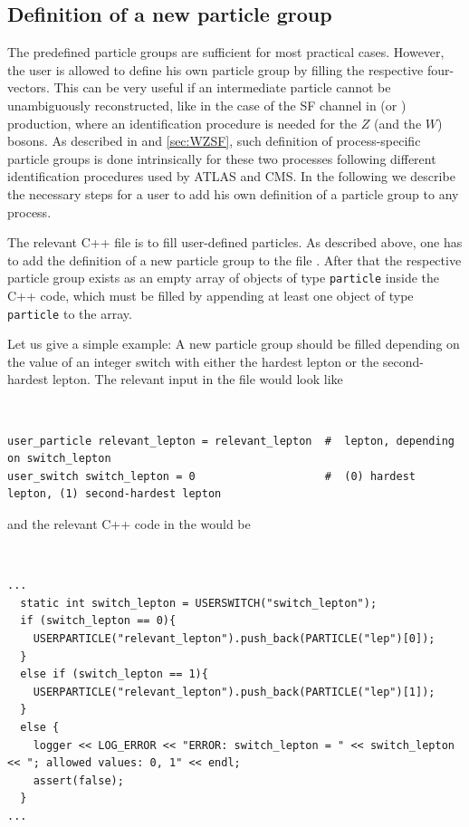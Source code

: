 \documentclass[english,11pt]{article}
\begin{document}
\subsection{Definition of a new particle group}\label{app:particlegroup}

The predefined particle groups are sufficient for most practical cases. However, the user
is allowed to define his own particle group by filling the respective four-vectors. This can 
be very useful if an intermediate particle cannot be unambiguously reconstructed, like in the case
of the SF channel in \zz{}(or \wz{}) production, where an identification procedure is needed for 
the $Z$ (and the $W$) bosons. As described in  and \ref{sec:WZSF}, such definition of process-specific 
particle groups is done intrinsically for these two processes following different identification procedures 
used by ATLAS and CMS. In the following we describe the necessary steps for a user to add his own
definition of a particle group to any process.

The relevant C++ file is \Matrixversion{} to fill user-defined particles.
As described above, one has to add the definition of a new particle group to the file . After that 
the respective particle group exists as an empty array of objects of type {\tt particle} inside the C++ code, which must 
be filled by appending at least one object of type {\tt particle} to the array.

Let us give a simple example: A new particle group should be filled depending on the value of an integer switch with either the 
hardest lepton or the second-hardest lepton. The relevant input in the file  would look like

{\tt
\begin{lstlisting}[style=InputStyle]
user_particle relevant_lepton = relevant_lepton  #  lepton, depending on switch_lepton
user_switch switch_lepton = 0                    #  (0) hardest lepton, (1) second-hardest lepton
\end{lstlisting}
}

and the relevant C++ code in the  would be

{\tt
\begin{lstlisting}     
...
  static int switch_lepton = USERSWITCH("switch_lepton");
  if (switch_lepton == 0){
    USERPARTICLE("relevant_lepton").push_back(PARTICLE("lep")[0]);
  }
  else if (switch_lepton == 1){
    USERPARTICLE("relevant_lepton").push_back(PARTICLE("lep")[1]);
  }
  else {
    logger << LOG_ERROR << "ERROR: switch_lepton = " << switch_lepton << "; allowed values: 0, 1" << endl;
    assert(false);
  }
...
\end{lstlisting}
}
\end{document}
